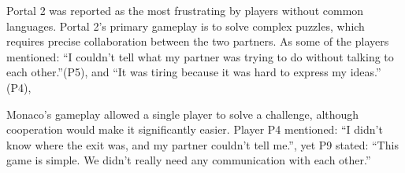 
Portal 2 was reported as the most frustrating by players without common languages. Portal 2's primary gameplay is to solve complex puzzles, which requires precise collaboration between the two partners. As some of the players mentioned: ``I couldn't tell what my partner was trying to do without talking to each other.''(P5), and ``It was tiring because it was hard to express my ideas.'' (P4),



Monaco's gameplay allowed a single player to solve a challenge, although cooperation would make it significantly easier. Player P4 mentioned: ``I didn't know where the exit was, and my partner couldn't tell me.'', yet P9 stated:  ``This game is simple. We didn't really need any communication with each other.''




